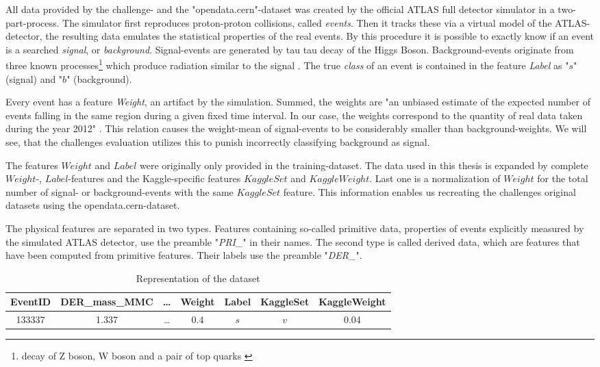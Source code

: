 All data provided by the challenge- and the "opendata.cern"-dataset \cite{higgsData} was created by the official ATLAS full detector simulator in a two-part-process. The simulator first reproduces proton-proton collisions, called \textit{events}. Then it tracks these via a virtual model of the ATLAS-detector, the resulting data emulates the statistical properties of the real events. By this procedure it is possible to exactly know if an event is a searched \textit{signal}, or \textit{background}. Signal-events are generated by tau tau decay of the Higgs Boson. Background-events originate from three known processes\footnote{decay of Z boson, W boson and a pair of top quarks \cite{higgsPaper}} which produce radiation similar to the signal \cite{higgsPaper}. The true \textit{class} of an event is contained in the feature \textit{Label} as "$s$" (signal) and "$b$" (background).

Every event has a feature \textit{Weight}, an artifact by the simulation. Summed, the weights are "an unbiased estimate of the expected number of events falling in the same region during a given fixed time interval. In our case, the weights correspond to the quantity of real data taken during the year 2012" \cite{higgsPaper}. This relation causes the weight-mean of signal-events to be considerably smaller than background-weights. We will see, that the challenges evaluation utilizes this to punish incorrectly classifying background as signal.

The features $Weight$ and $Label$ were originally only provided in the training-dataset. The data used in this thesis is expanded by complete $Weight$-, $Label$-features and the Kaggle-specific features $KaggleSet$ and $KaggleWeight$. Last one is a normalization of $Weight$ for the total number of signal- or background-events with the same $KaggleSet$ feature.
This information enables us recreating the challenges original datasets using the opendata.cern-dataset.

The physical features are separated in two types. Features containing so-called primitive data, properties of events explicitly measured by the simulated ATLAS detector, use the preamble "\textit{PRI\_}" in their names. The second type is called derived data, which are features that have been computed from primitive features. Their labels use the preamble "\textit{DER\_}".\\


\begin{table}[h]
	\begin{center}
		\begin{tabular}{ | c | c | c | c | c | c | c | }
		    \hline
		    EventID & DER\_mass\_MMC & \ldots & Weight & Label & KaggleSet & 
		    KaggleWeight \\
		    \hline
	    	133337  & 1.337   & \ldots & 0.4    & $s$ & $v$ & 0.04     \\
		    \hline
		\end{tabular} 
		\caption{Representation of the dataset}
	\end{center}
\end{table}


